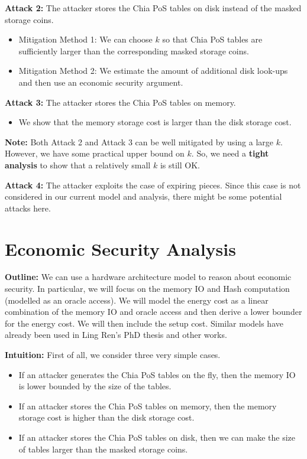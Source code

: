 \documentclass[12pt,draftcls,onecolumn]{IEEEtran}
\begin{document}
{\bf Attack 2:} The attacker stores the Chia PoS tables on disk instead of the masked storage coins.

\begin{itemize}
    \item Mitigation Method 1: We can choose $k$ so that Chia PoS tables are sufficiently larger than the corresponding masked storage coins.
    \item Mitigation Method 2: We estimate the amount of additional disk look-ups and then use an economic security argument.
\end{itemize}

{\bf Attack 3:} The attacker stores the Chia PoS tables on memory.

\begin{itemize}
    \item We show that the memory storage cost is larger than the disk storage cost.
\end{itemize}

{\bf Note:} Both Attack 2 and Attack 3 can be well mitigated by using a large $k$. However, we have some practical upper bound on $k$. So, we need a {\bf tight analysis} to show that a relatively small $k$ is still OK.

{\bf Attack 4:} The attacker exploits the case of expiring pieces. Since this case is not considered in our current model and analysis, there might be some potential attacks here.



\section{Economic Security Analysis}


{\bf Outline:} We can use a hardware architecture model to reason about economic security. In particular, we will focus on the memory IO and Hash computation (modelled as an oracle access). We will model the energy cost as a linear combination of the memory IO and oracle access and then derive a lower bounder for the energy cost. We will then include the setup cost. Similar models have already been used in Ling Ren's PhD thesis and other works.



{\bf Intuition:} First of all, we consider three very simple cases.
\begin{itemize}
    \item If an attacker generates the Chia PoS tables on the fly, then the memory IO is lower bounded by the size of the tables.
    \item If an attacker stores the Chia PoS tables on memory, then the memory storage cost is higher than the disk storage cost.
    \item If an attacker stores the Chia PoS tables on disk, then we can make the size of tables larger than the masked storage coins.
\end{itemize}
\end{document}
